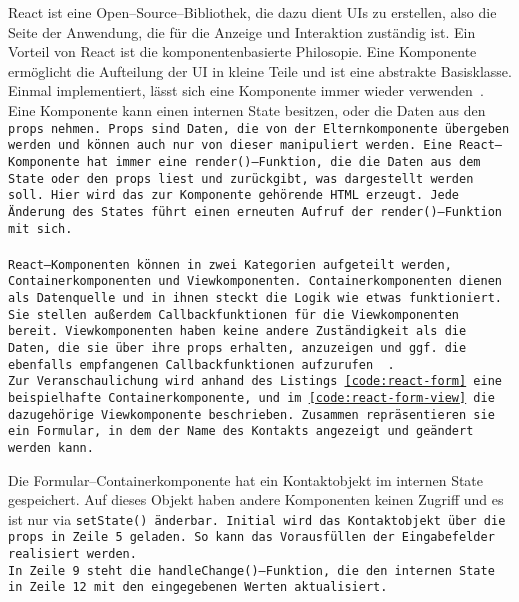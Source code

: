 React ist eine Open--Source--Bibliothek, die dazu dient \glspl{UI} zu erstellen, also die Seite der Anwendung, die für die Anzeige und Interaktion zuständig ist.
Ein Vorteil von React ist die komponentenbasierte Philosopie. Eine Komponente ermöglicht die Aufteilung der \gls{UI} in kleine Teile und ist eine abstrakte Basisklasse. Einmal implementiert, lässt sich eine Komponente immer wieder verwenden~\cite{react}.\\
%
Eine Komponente kann einen internen State besitzen, oder die Daten aus den \tt{props} nehmen.
\tt{Props} sind Daten, die von der Elternkomponente übergeben werden und können auch nur von dieser manipuliert werden.
Eine React--Komponente hat immer eine \tt{render()}--Funktion, die die Daten aus dem State oder den \tt{props} liest und zurückgibt, was dargestellt werden soll.
Hier wird das zur Komponente gehörende \gls{HTML} erzeugt. Jede Änderung des States führt einen erneuten Aufruf der \tt{render()}--Funktion mit sich.\\\\
%
%
React--Komponenten können in zwei Kategorien aufgeteilt werden, Containerkomponenten und Viewkomponenten.
Containerkomponenten dienen als Datenquelle und in ihnen steckt die Logik wie etwas funktioniert.
Sie stellen außerdem Callbackfunktionen für die Viewkomponenten bereit.
Viewkomponenten haben keine andere Zuständigkeit als die Daten, die sie über ihre \tt{props} erhalten, anzuzeigen und ggf. die ebenfalls empfangenen Callbackfunktionen aufzurufen ~\cite{react-components}.\\
Zur Veranschaulichung wird anhand des Listings \ref{code:react-form} eine beispielhafte Containerkomponente, und im \autoref{code:react-form-view} die dazugehörige Viewkomponente beschrieben.
Zusammen repräsentieren sie ein Formular, in dem der Name des Kontakts angezeigt und geändert werden kann.
%
\begin{center}
  
\end{center}
%
Die Formular--Containerkomponente hat ein Kontaktobjekt im internen State gespeichert.
Auf dieses Objekt haben andere Komponenten keinen Zugriff und es ist nur via \tt{setState()} änderbar.
Initial wird das Kontaktobjekt über die \tt{props} in Zeile 5 geladen. So kann das Vorausfüllen der Eingabefelder realisiert werden.\\
In Zeile 9 steht die \tt{handleChange()}--Funktion, die den internen State in Zeile 12 mit den eingegebenen Werten aktualisiert.
